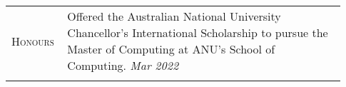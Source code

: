 \documentclass[letterpaper, 10pt, oneside]{article}
\newcommand{\stitle}[1]{\normalsize{\textsc{#1}}}
\begin{document}
\begin{longtable}{@{} p{0.13\linewidth} p{0.8\linewidth}}




    \stitle{Honours}
                         & Offered the Australian National University Chancellor's International Scholarship to pursue the Master of Computing at ANU's School of Computing.
    \hfill \textsl{Mar 2022}                                                                                                                                                                         \\
    \\[-1ex]


\end{longtable}
\end{document}
